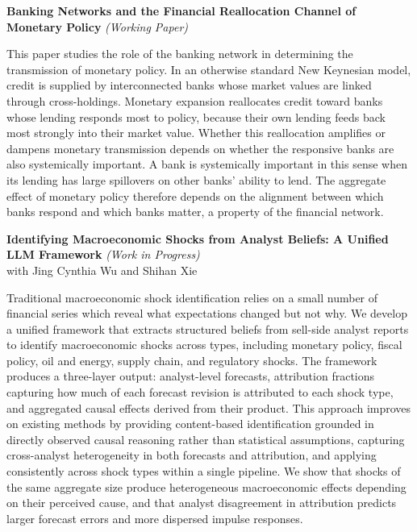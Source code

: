 \documentclass[12pt, letterpaper]{article}
\newenvironment{paperentry}{%
  \vspace{2pt}%
  \begin{list}{}{%
    \setlength{\leftmargin}{0pt}%
    \setlength{\topsep}{0pt}%
    \setlength{\itemsep}{0pt}%
    \setlength{\parsep}{3pt}%
  }\item%
}{%
  \end{list}\vspace{5pt}%
}
\newenvironment{paperabstract}{%
  \list{}{%
    \setlength{\leftmargin}{1.6em}%
    \setlength{\rightmargin}{1.6em}%
    \setlength{\topsep}{3pt}%
    \setlength{\parsep}{0pt}%
  }\item\relax\small%
}{%
  \endlist%
}
\begin{document}
\begin{paperentry}
  \textbf{Banking Networks and the Financial Reallocation Channel of Monetary Policy}
  \hfill{\small\itshape\color{muted}(Working Paper)}\\[2pt]
  \begin{paperabstract}
    This paper studies the role of the banking network in determining the transmission
    of monetary policy. In an otherwise standard New Keynesian model, credit is supplied
    by interconnected banks whose market values are linked through cross-holdings.
    Monetary expansion reallocates credit toward banks whose lending responds most to
    policy, because their own lending feeds back most strongly into their market value.
    Whether this reallocation amplifies or dampens monetary transmission depends on
    whether the responsive banks are also systemically important. A bank is systemically
    important in this sense when its lending has large spillovers on other banks' ability
    to lend. The aggregate effect of monetary policy therefore depends on the alignment
    between which banks respond and which banks matter, a property of the financial
    network.
  \end{paperabstract}
\end{paperentry}

\begin{paperentry}
  \textbf{Identifying Macroeconomic Shocks from Analyst Beliefs: A Unified LLM Framework}
  \hfill{\small\itshape\color{muted}(Work in Progress)}\\[2pt]
  {\small with Jing Cynthia Wu and Shihan Xie}
  \begin{paperabstract}
    Traditional macroeconomic shock identification relies on a small number of financial
    series which reveal what expectations changed but not why. We develop a unified
    framework that extracts structured beliefs from sell-side analyst reports to identify
    macroeconomic shocks across types, including monetary policy, fiscal policy, oil and
    energy, supply chain, and regulatory shocks. The framework produces a three-layer
    output: analyst-level forecasts, attribution fractions capturing how much of each
    forecast revision is attributed to each shock type, and aggregated causal effects
    derived from their product. This approach improves on existing methods by providing
    content-based identification grounded in directly observed causal reasoning rather
    than statistical assumptions, capturing cross-analyst heterogeneity in both forecasts
    and attribution, and applying consistently across shock types within a single pipeline.
    We show that shocks of the same aggregate size produce heterogeneous macroeconomic
    effects depending on their perceived cause, and that analyst disagreement in
    attribution predicts larger forecast errors and more dispersed impulse responses.
  \end{paperabstract}
\end{paperentry}
\end{document}
